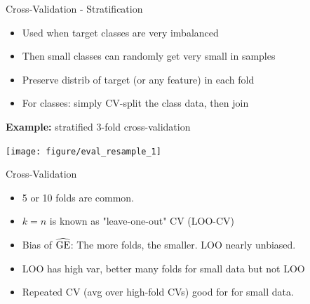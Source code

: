 \documentclass[11pt,compress,t,notes=noshow, xcolor=table]{beamer}
\begin{document}
\begin{vbframe}{Cross-Validation - Stratification}

\begin{itemize}
    \item Used when target classes are very imbalanced
    \item Then small classes can randomly get very small in samples   
    \item Preserve distrib of target (or any feature) in each fold
    \item For classes: simply CV-split the class data, then join
\end{itemize}

\lz

\textbf{Example:} stratified 3-fold cross-validation
\begin{center}
\texttt{[image: figure/eval\_resample\_1]} 
\end{center}
\end{vbframe}




\begin{vbframe}{Cross-Validation}

\begin{itemize}
  \item 5 or 10 folds are common.%
  \item $k = n$ is known as "leave-one-out" CV (LOO-CV)
  \item Bias of $\widehat{\mathrm{GE}}$: The more folds, the smaller. LOO nearly unbiased. 
  \item LOO has high var, better many folds for small data but not LOO
  \item Repeated CV (avg over high-fold CVs) good for 
      for small data.
\end{itemize}
\end{vbframe}

\end{document}
